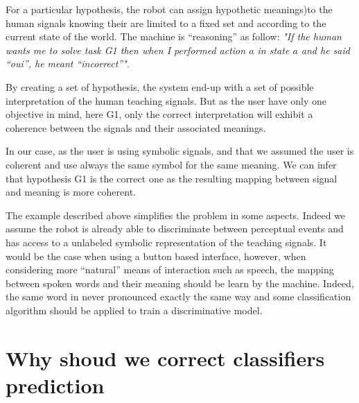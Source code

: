 
For a particular hypothesis, the robot can assign hypothetic meanings)to the human signals knowing their are limited to a fixed set and according to the current state of the world. The machine is ``reasoning'' as follow: \emph{"If the human wants me to solve task G1 then when I performed action $a$ in state $a$ and he said ``oui'', he meant ``incorrect''"}. 


By creating a set of hypothesis, the system end-up with a set of possible interpretation of the human teaching signals. But as the user have only one objective in mind, here G1, only the correct interpretation will exhibit a coherence between the signals and their associated meanings. 

In our case, as the user is using symbolic signals, and that we assumed the user is coherent and use always the same symbol for the same meaning. We can infer that hypothesis G1 is the correct one as the resulting mapping between signal and meaning is more coherent.


The example described above simplifies the problem in some aspects. Indeed we assume the robot is already able to discriminate between perceptual events and has access to a unlabeled symbolic representation of the teaching signals. It would be the case when using a button based interface, however, when considering more ``natural'' means of interaction such as speech, the mapping between spoken words and their meaning should be learn by the machine. Indeed, the same word in never pronounced exactly the same way and some classification algorithm should be applied to train a discriminative model.



\section{Why shoud we correct classifiers prediction}


